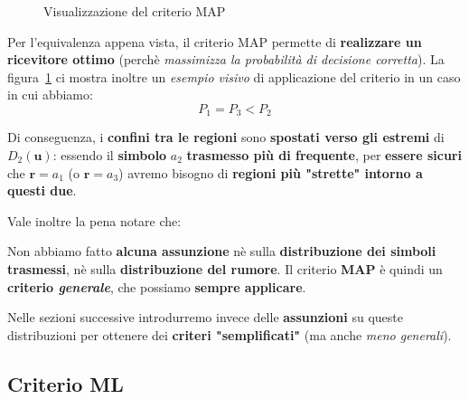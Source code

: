 \begin{figure}[!ht]
    \caption{Visualizzazione del criterio MAP}
    \label{fig:08_09_CriterioMAP}
\end{figure}

Per l'equivalenza appena vista, il criterio MAP permette di 
\textbf{realizzare un ricevitore ottimo} (perchè \textit{massimizza la probabilità di decisione corretta}).
La figura~\ref{fig:08_09_CriterioMAP} ci mostra inoltre un \textit{esempio visivo} di applicazione
del criterio in un caso in cui abbiamo:
\[
    P_{1} = P_{3} < P_{2}
\]
\begin{remark}
    Di conseguenza, i \textbf{confini tra le regioni} sono \textbf{spostati verso gli estremi}
    di $D_{2}(\mathbf{u})$: essendo il \textbf{simbolo} $a_{2}$ \textbf{trasmesso più di frequente}, 
    per \textbf{essere sicuri} che $\mathbf{r}=a_{1}$ (o $\mathbf{r}=a_{3}$) avremo bisogno
    di \textbf{regioni più "strette" intorno a questi due}.
\end{remark}

Vale inoltre la pena notare che:

\begin{remark}
    Non abbiamo fatto \textbf{alcuna assunzione} nè sulla \textbf{distribuzione dei simboli trasmessi},
    nè sulla \textbf{distribuzione del rumore}.
    Il criterio \textbf{MAP} è quindi un \textbf{criterio \textit{generale}}, che possiamo
    \textbf{sempre applicare}.
\end{remark}

Nelle sezioni successive introdurremo invece delle \textbf{assunzioni} su queste distribuzioni
per ottenere dei \textbf{criteri "semplificati"} (ma anche \textit{meno generali}).

\subsection{Criterio ML}

